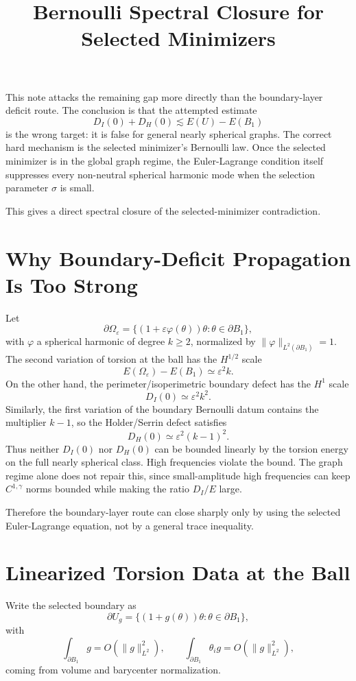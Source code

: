 \documentclass[11pt]{article}
\title{Bernoulli Spectral Closure for Selected Minimizers}
\author{}
\date{}
\begin{document}
\maketitle

This note attacks the remaining gap more directly than the boundary-layer
deficit route. The conclusion is that the attempted estimate
\[
D_I(0)+D_H(0)\lesssim E(U)-E(B_1)
\]
is the wrong target: it is false for general nearly spherical graphs. The
correct hard mechanism is the selected minimizer's Bernoulli law. Once the
selected minimizer is in the global graph regime, the Euler-Lagrange condition
itself suppresses every non-neutral spherical harmonic mode when the selection
parameter \(\sigma\) is small.

This gives a direct spectral closure of the selected-minimizer contradiction.

\section{Why Boundary-Deficit Propagation Is Too Strong}

Let
\[
\partial\Omega_\varepsilon
=\{(1+\varepsilon\varphi(\theta))\theta:\theta\in\partial B_1\},
\]
with \(\varphi\) a spherical harmonic of degree \(k\ge2\), normalized by
\(\|\varphi\|_{L^2(\partial B_1)}=1\). The second variation of torsion at the
ball has the \(H^{1/2}\) scale
\[
E(\Omega_\varepsilon)-E(B_1)
\simeq
\varepsilon^2 k.
\]
On the other hand, the perimeter/isoperimetric boundary defect has the \(H^1\)
scale
\[
D_I(0)
\simeq
\varepsilon^2 k^2.
\]
Similarly, the first variation of the boundary Bernoulli datum contains the
multiplier \(k-1\), so the Holder/Serrin defect satisfies
\[
D_H(0)\simeq \varepsilon^2(k-1)^2.
\]
Thus neither \(D_I(0)\) nor \(D_H(0)\) can be bounded linearly by the torsion
energy on the full nearly spherical class. High frequencies violate the bound.
The graph regime alone does not repair this, since small-amplitude high
frequencies can keep \(C^{1,\gamma}\) norms bounded while making the ratio
\(D_I/E\) large.

Therefore the boundary-layer route can close sharply only by using the
selected Euler-Lagrange equation, not by a general trace inequality.

\section{Linearized Torsion Data at the Ball}

Write the selected boundary as
\[
\partial U_g=\{(1+g(\theta))\theta:\theta\in\partial B_1\},
\]
with
\[
\int_{\partial B_1}g=O(\|g\|_{L^2}^2),
\qquad
\int_{\partial B_1}\theta_i g=O(\|g\|_{L^2}^2),
\]
coming from volume and barycenter normalization.
\end{document}
